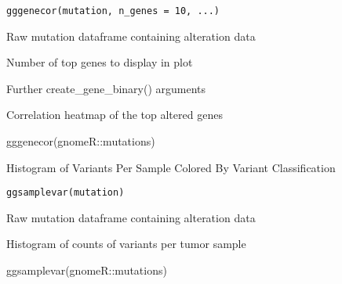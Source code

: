 \documentclass[a4paper]{book}
\begin{document}
%
\begin{Usage}
\begin{verbatim}
gggenecor(mutation, n_genes = 10, ...)
\end{verbatim}
\end{Usage}
%
\begin{Arguments}
\begin{ldescription}
\item[\code{mutation}] Raw mutation dataframe containing alteration data

\item[\code{n\_genes}] Number of top genes to display in plot

\item[\code{...}] Further create\_gene\_binary() arguments
\end{ldescription}
\end{Arguments}
%
\begin{Value}
Correlation heatmap of the top altered genes
\end{Value}
%
\begin{Examples}
\begin{ExampleCode}
gggenecor(gnomeR::mutations)

\end{ExampleCode}
\end{Examples}
%
\begin{Description}\relax
Histogram of Variants Per Sample Colored By Variant Classification
\end{Description}
%
\begin{Usage}
\begin{verbatim}
ggsamplevar(mutation)
\end{verbatim}
\end{Usage}
%
\begin{Arguments}
\begin{ldescription}
\item[\code{mutation}] Raw mutation dataframe containing alteration data
\end{ldescription}
\end{Arguments}
%
\begin{Value}
Histogram of counts of variants per tumor sample
\end{Value}
%
\begin{Examples}
\begin{ExampleCode}
ggsamplevar(gnomeR::mutations)

\end{ExampleCode}
\end{Examples}
\end{document}
